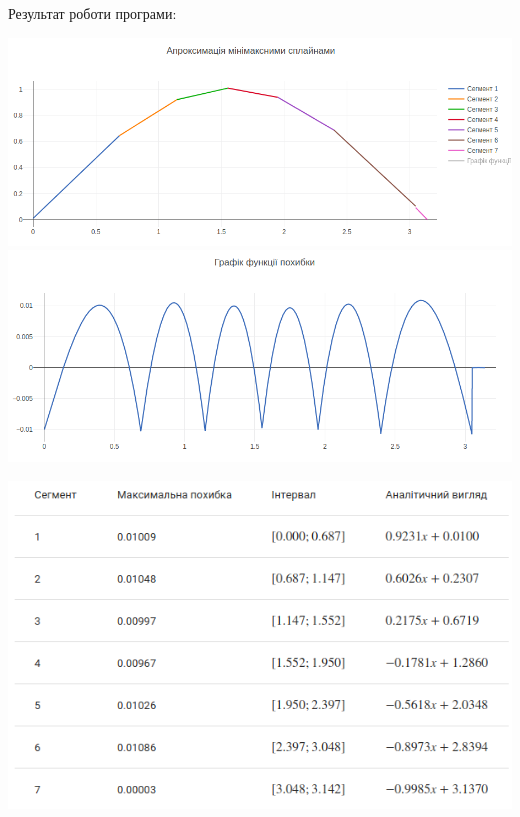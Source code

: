 \documentclass[ukrainian,14pt]{extarticle}
\begin{document}
\vspace{1cm}

Результат роботи програми:
\vspace{0.5cm}

\includegraphics[scale=0.5]{example2}
\includegraphics[scale=0.5]{example_2_error} \\
\vspace{0.5cm}

\includegraphics[scale=0.7]{example2_table}

\newpage
\end{document}
